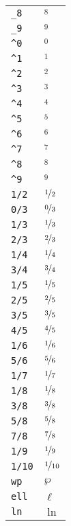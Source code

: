 \begin{longtable}{ll}
\texttt{\_8}&${}_8 {}$\\
\texttt{\_9}&${}_9 {}$\\
\texttt{\textasciicircum 0}&${}^0 {}$\\
\texttt{\textasciicircum 1}&${}^1 {}$\\
\texttt{\textasciicircum 2}&${}^2 {}$\\
\texttt{\textasciicircum 3}&${}^3 {}$\\
\texttt{\textasciicircum 4}&${}^4 {}$\\
\texttt{\textasciicircum 5}&${}^5 {}$\\
\texttt{\textasciicircum 6}&${}^6 {}$\\
\texttt{\textasciicircum 7}&${}^7 {}$\\
\texttt{\textasciicircum 8}&${}^8 {}$\\
\texttt{\textasciicircum 9}&${}^9 {}$\\
\texttt{1/2}&${}\nicefrac{1}{2} {}$\\
\texttt{0/3}&${}\nicefrac{0}{3} {}$\\
\texttt{1/3}&${}\nicefrac{1}{3} {}$\\
\texttt{2/3}&${}\nicefrac{2}{3} {}$\\
\texttt{1/4}&${}\nicefrac{1}{4} {}$\\
\texttt{3/4}&${}\nicefrac{3}{4} {}$\\
\texttt{1/5}&${}\nicefrac{1}{5} {}$\\
\texttt{2/5}&${}\nicefrac{2}{5} {}$\\
\texttt{3/5}&${}\nicefrac{3}{5} {}$\\
\texttt{4/5}&${}\nicefrac{4}{5} {}$\\
\texttt{1/6}&${}\nicefrac{1}{6} {}$\\
\texttt{5/6}&${}\nicefrac{5}{6} {}$\\
\texttt{1/7}&${}\nicefrac{1}{7} {}$\\
\texttt{1/8}&${}\nicefrac{1}{8} {}$\\
\texttt{3/8}&${}\nicefrac{3}{8} {}$\\
\texttt{5/8}&${}\nicefrac{5}{8} {}$\\
\texttt{7/8}&${}\nicefrac{7}{8} {}$\\
\texttt{1/9}&${}\nicefrac{1}{9} {}$\\
\texttt{1/10}&${}\nicefrac{1}{10} {}$\\
\texttt{wp}&${}\wp {}$\\
\texttt{ell}&${}\ell {}$\\
\texttt{ln}&${}\ln {}$\\

\end{longtable}
